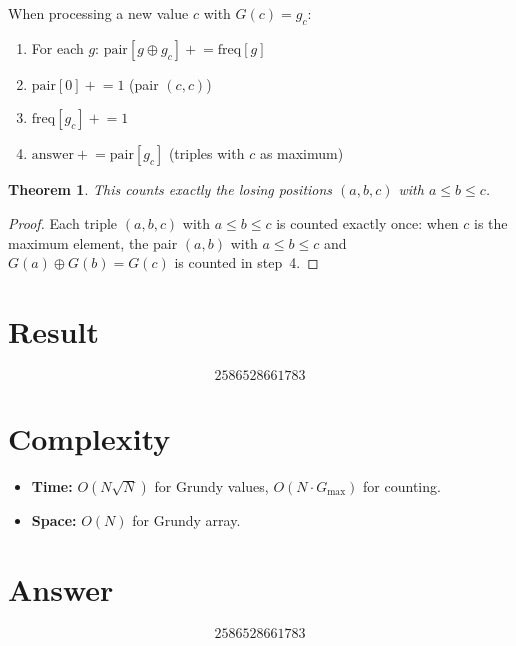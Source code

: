 \documentclass[12pt]{article}
\newtheorem{theorem}{Theorem}
\theoremstyle{definition}
\begin{document}
When processing a new value $c$ with $G(c) = g_c$:
\begin{enumerate}
    \item For each $g$: $\text{pair}[g \oplus g_c] \mathrel{+}= \text{freq}[g]$
    \item $\text{pair}[0] \mathrel{+}= 1$ \quad (pair $(c,c)$)
    \item $\text{freq}[g_c] \mathrel{+}= 1$
    \item $\text{answer} \mathrel{+}= \text{pair}[g_c]$ \quad (triples with $c$ as maximum)
\end{enumerate}

\begin{theorem}
This counts exactly the losing positions $(a,b,c)$ with $a \leq b \leq c$.
\end{theorem}

\begin{proof}
Each triple $(a,b,c)$ with $a \leq b \leq c$ is counted exactly once: when $c$ is the maximum element, the pair $(a,b)$ with $a \leq b \leq c$ and $G(a) \oplus G(b) = G(c)$ is counted in step~4.
\end{proof}

\section{Result}
\[
    \boxed{2586528661783}
\]

\section{Complexity}
\begin{itemize}
    \item \textbf{Time:} $O(N\sqrt{N})$ for Grundy values, $O(N \cdot G_{\max})$ for counting.
    \item \textbf{Space:} $O(N)$ for Grundy array.
\end{itemize}

\section{Answer}

\[
\boxed{2586528661783}
\]
\end{document}
